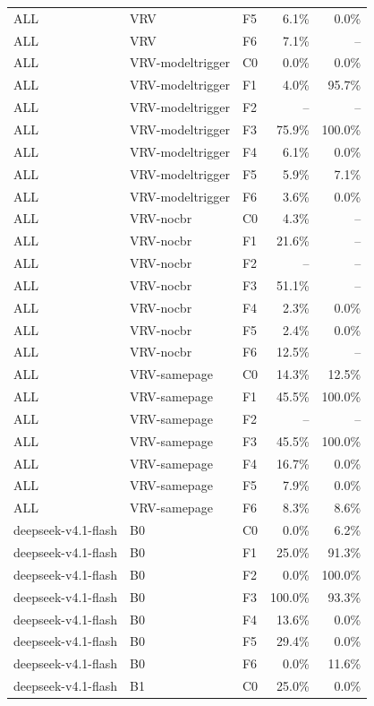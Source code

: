 \begin{tabular}{lllrr}
ALL & VRV & F5 & 6.1\% & 0.0\% \\
ALL & VRV & F6 & 7.1\% & -- \\
ALL & VRV-modeltrigger & C0 & 0.0\% & 0.0\% \\
ALL & VRV-modeltrigger & F1 & 4.0\% & 95.7\% \\
ALL & VRV-modeltrigger & F2 & -- & -- \\
ALL & VRV-modeltrigger & F3 & 75.9\% & 100.0\% \\
ALL & VRV-modeltrigger & F4 & 6.1\% & 0.0\% \\
ALL & VRV-modeltrigger & F5 & 5.9\% & 7.1\% \\
ALL & VRV-modeltrigger & F6 & 3.6\% & 0.0\% \\
ALL & VRV-nocbr & C0 & 4.3\% & -- \\
ALL & VRV-nocbr & F1 & 21.6\% & -- \\
ALL & VRV-nocbr & F2 & -- & -- \\
ALL & VRV-nocbr & F3 & 51.1\% & -- \\
ALL & VRV-nocbr & F4 & 2.3\% & 0.0\% \\
ALL & VRV-nocbr & F5 & 2.4\% & 0.0\% \\
ALL & VRV-nocbr & F6 & 12.5\% & -- \\
ALL & VRV-samepage & C0 & 14.3\% & 12.5\% \\
ALL & VRV-samepage & F1 & 45.5\% & 100.0\% \\
ALL & VRV-samepage & F2 & -- & -- \\
ALL & VRV-samepage & F3 & 45.5\% & 100.0\% \\
ALL & VRV-samepage & F4 & 16.7\% & 0.0\% \\
ALL & VRV-samepage & F5 & 7.9\% & 0.0\% \\
ALL & VRV-samepage & F6 & 8.3\% & 8.6\% \\
deepseek-v4.1-flash & B0 & C0 & 0.0\% & 6.2\% \\
deepseek-v4.1-flash & B0 & F1 & 25.0\% & 91.3\% \\
deepseek-v4.1-flash & B0 & F2 & 0.0\% & 100.0\% \\
deepseek-v4.1-flash & B0 & F3 & 100.0\% & 93.3\% \\
deepseek-v4.1-flash & B0 & F4 & 13.6\% & 0.0\% \\
deepseek-v4.1-flash & B0 & F5 & 29.4\% & 0.0\% \\
deepseek-v4.1-flash & B0 & F6 & 0.0\% & 11.6\% \\
deepseek-v4.1-flash & B1 & C0 & 25.0\% & 0.0\% \\

\end{tabular}

